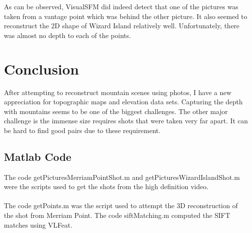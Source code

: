 \documentclass[11pt,psfig]{article}
\begin{document}
As can be observed, VisualSFM did indeed detect that one of the pictures was taken from a vantage point which was behind the other picture. It also seemed to reconstruct the 2D shape of Wizard Island relatively well. Unfortunately, there was almost no depth to each of the points. 


\section{Conclusion}

After attempting to reconstruct mountain scenes using photos, I have a new appreciation for topographic maps and elevation data sets. Capturing the depth with mountains seems to be one of the biggest challenges. The other major challenge is the immense size requires shots that were taken very far apart. It can be hard to find good pairs due to these requirement. 

\subsection{Matlab Code}

The code getPicturesMerriamPointShot.m and getPicturesWizardIslandShot.m were the scripts used to get the shots from the high definition video.\\
\\
The code getPoints.m was the script used to attempt the 3D reconstruction of the shot from Merriam Point. The code siftMatching.m computed the SIFT matches using VLFeat. 
\end{document}
